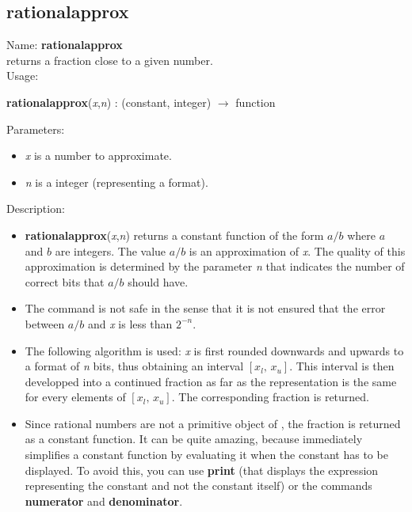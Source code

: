 \subsection{rationalapprox}
\label{labrationalapprox}
\noindent Name: \textbf{rationalapprox}\\
returns a fraction close to a given number.\\
\noindent Usage: 
\begin{center}
\textbf{rationalapprox}(\emph{x},\emph{n}) : (\textsf{constant}, \textsf{integer}) $\rightarrow$ \textsf{function}
\\ 
\end{center}
Parameters: 
\begin{itemize}
\item \emph{x} is a number to approximate.
\item \emph{n} is a integer (representing a format).
\end{itemize}
\noindent Description: \begin{itemize}

\item \textbf{rationalapprox}(\emph{x},\emph{n}) returns a constant function of the form $a/b$ where $a$ and $b$ are
   integers. The value $a/b$ is an approximation of \emph{x}. The quality of this 
   approximation is determined by the parameter \emph{n} that indicates the number of
   correct bits that $a/b$ should have.

\item The command is not safe in the sense that it is not ensured that the error 
   between $a/b$ and \emph{x} is less than $2^{-n}$.

\item The following algorithm is used: \emph{x} is first rounded downwards and upwards to
   a format of \emph{n} bits, thus obtaining an interval $[x_l,\,x_u]$. This interval is then
   developped into a continued fraction as far as the representation is the same
   for every elements of $[x_l,\,x_u]$. The corresponding fraction is returned.

\item Since rational numbers are not a primitive object of \sollya, the fraction is
   returned as a constant function. It can be quite amazing, because \sollya
   immediately simplifies a constant function by evaluating it when the constant
   has to be displayed.
   To avoid this, you can use \textbf{print} (that displays the expression representing
   the constant and not the constant itself) or the commands \textbf{numerator} 
   and \textbf{denominator}.
\end{itemize}
